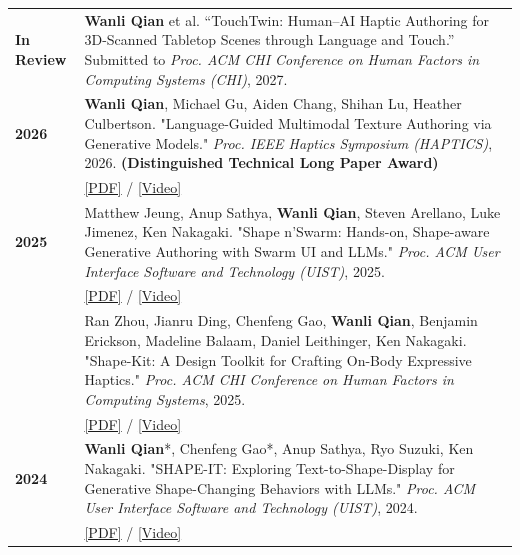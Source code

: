 \documentclass[12pt, letterpaper]{article}
\newlength{\datecolwidth}
\begin{document}
\noindent
\begin{tabularx}{\textwidth}{@{}p{\datecolwidth} X@{}}
    
    \textbf{In Review} & \textbf{Wanli Qian} et al. ``TouchTwin: Human--AI Haptic Authoring for 3D-Scanned Tabletop Scenes through Language and Touch.'' Submitted to \textit{Proc. ACM CHI Conference on Human Factors in Computing Systems (CHI)}, 2027. \\[6pt]

    \textbf{2026} & \textbf{Wanli Qian}, Michael Gu, Aiden Chang, Shihan Lu, Heather Culbertson. "Language-Guided Multimodal Texture Authoring via Generative Models." \textit{Proc. IEEE Haptics Symposium (HAPTICS)}, 2026. \textbf{(Distinguished Technical Long Paper Award)}\\
    & \href{https://arxiv.org/abs/2604.06489}{[PDF]} / \href{https://youtu.be/f5vz52uPw-4?si=IwPee25Zb0pjWJ3Y}{[Video]} \\[6pt]

    \textbf{2025} & Matthew Jeung, Anup Sathya, \textbf{Wanli Qian}, Steven Arellano, Luke Jimenez, Ken Nakagaki. "Shape n’Swarm: Hands-on, Shape-aware Generative Authoring with Swarm UI and LLMs." \textit{Proc. ACM User Interface Software and Technology (UIST)}, 2025. \\
    & \href{https://dl.acm.org/doi/10.1145/3746059.3747781}{[PDF]} / \href{https://www.youtube.com/watch?v=5u0M9yL7tyY}{[Video]} \\[6pt]

    & Ran Zhou, Jianru Ding, Chenfeng Gao, \textbf{Wanli Qian}, Benjamin Erickson, Madeline Balaam, Daniel Leithinger, Ken Nakagaki. "Shape-Kit: A Design Toolkit for Crafting On-Body Expressive Haptics." \textit{Proc. ACM CHI Conference on Human Factors in Computing Systems}, 2025. \\
     & \href{https://dl.acm.org/doi/10.1145/3706599.3721280}{[PDF]} / \href{https://www.youtube.com/watch?v=W_rZg8f6lZM}{[Video]} \\[6pt]

    \textbf{2024} & \textbf{Wanli Qian}*, Chenfeng Gao*, Anup Sathya, Ryo Suzuki, Ken Nakagaki. "SHAPE-IT: Exploring Text-to-Shape-Display for Generative Shape-Changing Behaviors with LLMs." \textit{Proc. ACM User Interface Software and Technology (UIST)}, 2024. \\
    & \href{https://dl.acm.org/doi/10.1145/3654777.3676348}{[PDF]} / \href{https://www.youtube.com/watch?v=2NxzOBc7AdQ}{[Video]} \\[6pt]


\end{tabularx}
\end{document}

